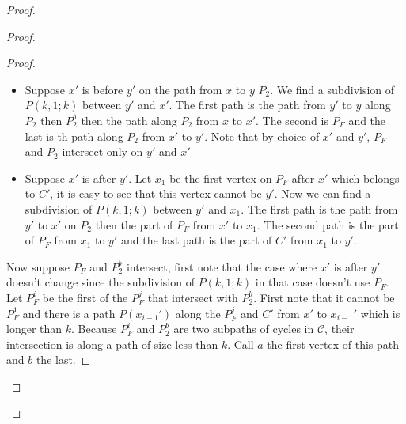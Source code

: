 \documentclass[10pt]{article}
\theoremstyle{plain}
\theoremstyle{definition}
\theoremstyle{remark}
\begin{document}
\begin{proof}
\begin{proof}
\begin{proof}
\begin{itemize}
	\item Suppose $x'$ is before $y'$ on the path from $x$ to $y$ $P_2$. We find a subdivision of $P(k,1;k)$ between $y'$ and $x'$.
	The first path is the path from $y'$ to $y$ along $P_2$ then $P_2^b$ then the path along $P_2$ from $x$ to $x'$. The second 
	is $P_F$ and the last is th path along $P_2$ from $x'$ to $y'$. Note that by choice of $x'$ and $y'$, $P_F$ and $P_2$ intersect
	only on $y'$ and $x'$
	\item Suppose $x'$ is after $y'$. Let $x_1$ be the first vertex on $P_F$ after $x'$ which belongs to $C'$, it is easy to see that
	this vertex cannot be $y'$. Now we can find a subdivision of $P(k,1;k)$ between $y'$ and $x_1$. The first path is the path from $y'$
	to $x'$ on $P_2$ then the part of $P_F$ from $x'$ to $x_1$. The second path is the part of $P_F$ from $x_1$ to $y'$ and the last path is
	the part of $C'$ from $x_1$ to $y'$.
\end{itemize}

Now suppose $P_F$ and $P_2^b$ intersect, first note that the case where $x'$ is after $y'$ doesn't change since the subdivision 
of $P(k,1;k)$ in that case doesn't use $P_F$. 
Let $P_F^i$ be the first of the $P_F^j$ that intersect with $P_2^b$. First note that it cannot be $P_F^1$ and there is a path $P(x_{i-1}')$
along the $P_F^j$ and $C'$ from $x'$ to $x_{i-1}'$ which is longer than $k$.
Because $P_F^i$ and $P_2^b$ are two subpaths of cycles in $\mathcal{C}$, their intersection is along a path of size less than $k$.
Call $a$ the first vertex of this path and $b$ the last.


\end{proof}
\end{proof}
\end{proof}
\end{document}
